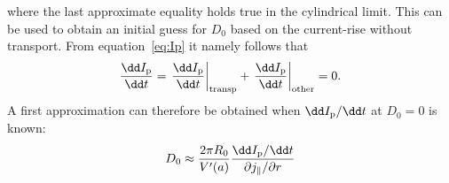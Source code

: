 \documentclass{notes}
\begin{document}
	where the last approximate equality holds true in the cylindrical limit.
	This can be used to obtain an initial guess for $D_0$ based on the
	current-rise without transport. From equation~\eqref{eq:Ip} it namely
	follows that
	\begin{equation}\label{eq:dIdt}
		\frac{\dd I_{\rm p}}{\dd t} =
			\left.\frac{\dd I_{\rm p}}{\dd t}\right|_{\rm transp} +
			\left.\frac{\dd I_{\rm p}}{\dd t}\right|_{\rm other}
			= 0.
	\end{equation}
	A first approximation can therefore be obtained when $\dd I_{\rm p}/\dd t$
	at $D_0=0$ is known:
	\begin{equation}\label{eq:D0app}
		D_0\approx \frac{2\pi R_0}{V'(a)}
			\frac{\dd I_{\rm p} / \dd t}
			{\partial j_\parallel/\partial r}
	\end{equation}
\end{document}
